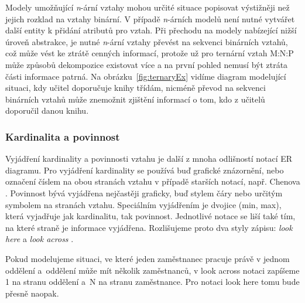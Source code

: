 \documentclass[czech,bachelor,public,dept460,male,oneside]{diploma}
\begin{document}
		Modely umožňující \textit{n}-ární vztahy mohou určité situace popisovat výstižněji než jejich rozklad na vztahy binární. V případě \textit{n}-árních modelů není nutné vytvářet další entity k přidání atributů pro vztah. Při přechodu na modely nabízející nižší úroveň abstrakce, je nutné \textit{n}-ární vztahy převést na sekvenci binárních vztahů, což může vést ke ztrátě cenných informací, protože už pro ternární vztah M:N:P může způsobů dekompozice existovat více a na první pohled nemusí být ztráta části informace patrná. Na obrázku~\ref{fig:ternaryEx} vidíme diagram modelující situaci, kdy učitel doporučuje knihy třídám, nicméně převod na sekvenci binárních vztahů může znemožnit zjištění informací o tom, kdo z učitelů doporučil danou knihu.
		
		
		\subsubsection{Kardinalita a povinnost}
		Vyjádření kardinality a povinnosti vztahu je další z mnoha odlišností notací ER diagramu. Pro vyjádření kardinality se používá buď grafické znázornění, nebo označení číslem na obou stranách vztahu v případě starších notací, např. Chenova \cite{dbVsb}. Povinnost bývá vyjádřena nejčastěji graficky, buď stylem čáry nebo určitým symbolem na stranách vztahu. Speciálním vyjádřením je dvojice (min, max), která vyjadřuje jak kardinalitu, tak povinnost. Jednotlivé notace se liší také tím, na které straně je informace vyjádřena. Rozlišujeme proto dva styly zápisu: \emph{look here} a \emph{look across} \cite{compErNotations}. 
		
		Pokud modelujeme situaci, ve které jeden zaměstnanec pracuje právě v jednom oddělení a~oddělení může mít několik zaměstnanců, v look across notaci zapíšeme 1 na stranu oddělení a~N na stranu zaměstnance. Pro notaci look here tomu bude přesně naopak. 
		
	
\end{document}
